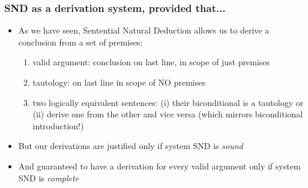 \begin{frame}
\frametitle{SND as a derivation system, provided that...}

\begin{itemize}[<+->]

\item As we have seen, Sentential Natural Deduction allows us to derive a conclusion from a set of premises:



\begin{enumerate}[1.)]

\item valid argument: conclusion on last line, in scope of just premises %

\item tautology: on last line in scope of NO premises %

\item two logically equivalent sentences: (i) their biconditional is a tautology or (ii) derive one from the other and vice versa (which mirrors biconditional introduction!)

\end{enumerate}

\item But our derivations are justified only if system SND is \textit{sound}

\item And guaranteed to have a derivation for every valid argument only if system SND is \textit{complete}




\end{itemize}
\end{frame}

